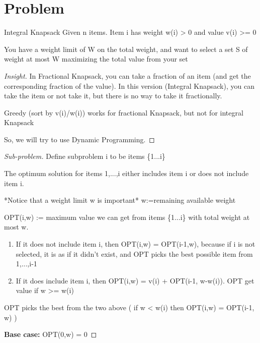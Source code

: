 \documentclass[openany]{article}
\begin{document}
\section*{Problem}
\begin{problem*}{Integral Knapsack}
    Given n items. Item i has weight w(i) > 0 and value v(i) >= 0
    
    You have a weight limit of W on the total weight, and want to select a set S of weight at most W maximizing the total value from your set
    
\end{problem*}
\begin{proof}[Insight]{}
\renewcommand{\qedsymbol}{}
    In Fractional Knapsack, you can take a fraction of an item (and get the corresponding fraction of the value). In this version (Integral Knapsack), you can take the item or not take it, but there is no way to take it fractionally.
    
    Greedy (sort by v(i)/w(i)) works for fractional Knapsack, but not for integral Knapsack
    
    So, we will try to use Dynamic Programming.
\end{proof}
\begin{proof}[Sub-problem]{}
\renewcommand{\qedsymbol}{}
    Define subproblem i to be items \{1...i\}
    
    The optimum solution for items 1,...,i either includes item i or does not include item i.
    
    *Notice that a weight limit w is important*  w:=remaining available weight
    
    OPT(i,w) := maximum value we can get from items \{1...i\} with total weight at most w.
    \begin{enumerate}
        \item If it does not include item i, then OPT(i,w) = OPT(i-1,w), because if i is not selected, it is as if it didn't exist, and OPT picks the best possible item from 1,...,i-1
        \item If it does include item i, then OPT(i,w) = v(i) + OPT(i-1, w-w(i)). OPT get value if w >= w(i)
    \end{enumerate}
    OPT picks the best from the two above ( if w < w(i) then OPT(i,w) = OPT(i-1, w) )
    
    \textbf{Base case:} OPT(0,w) = 0
\end{proof}
\end{document}
